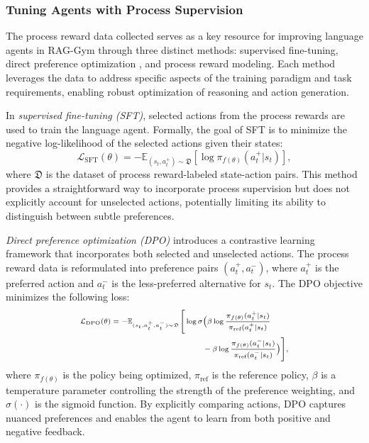 \subsubsection{Tuning Agents with Process Supervision} \label{sec:process_tune}

The process reward data collected serves as a key resource for improving language agents in RAG-Gym through three distinct methods: supervised fine-tuning, direct preference optimization \citep{rafailov2024direct}, and process reward modeling. Each method leverages the data to address specific aspects of the training paradigm and task requirements, enabling robust optimization of reasoning and action generation.

In \textit{supervised fine-tuning (SFT)}, selected actions from the process rewards are used to train the language agent. Formally, the goal of SFT is to minimize the negative log-likelihood of the selected actions given their states:
\begin{equation}
\mathcal{L}_{\text{SFT}}(\theta) = -\mathbb{E}_{(s_t, a_t^+) \sim \mathfrak{D}} \left[ \log \pi_{f(\theta)}(a_t^+ | s_t) \right],
\end{equation}
where \(\mathfrak{D}\) is the dataset of process reward-labeled state-action pairs. This method provides a straightforward way to incorporate process supervision but does not explicitly account for unselected actions, potentially limiting its ability to distinguish between subtle preferences.

\textit{Direct preference optimization (DPO)} introduces a contrastive learning framework that incorporates both selected and unselected actions. The process reward data is reformulated into preference pairs \((a_t^+, a_t^-)\), where \(a_t^+\) is the preferred action and \(a_t^-\) is the less-preferred alternative for \(s_t\). The DPO objective minimizes the following loss:
\begin{equation}\scriptsize
\begin{aligned}
\mathcal{L}_{\text{DPO}}(\theta) = - \mathbb{E}_{(s_t, a_t^+, a_t^-) \sim \mathfrak{D}} 
\Bigg[ \log \sigma &\Big( \beta \log \frac{\pi_{f(\theta)}(a_t^+ | s_t)}{\pi_{\text{ref}}(a_t^+ | s_t)}\\ &  - \beta \log \frac{\pi_{f(\theta)}(a_t^- | s_t)}{\pi_{\text{ref}}(a_t^- | s_t)}  \Big) \Bigg],
\end{aligned}
\end{equation}
where \(\pi_{f(\theta)}\) is the policy being optimized, \(\pi_{\text{ref}}\) is the reference policy, \(\beta\) is a temperature parameter controlling the strength of the preference weighting, and \(\sigma(\cdot)\) is the sigmoid function. By explicitly comparing actions, DPO captures nuanced preferences and enables the agent to learn from both positive and negative feedback.

